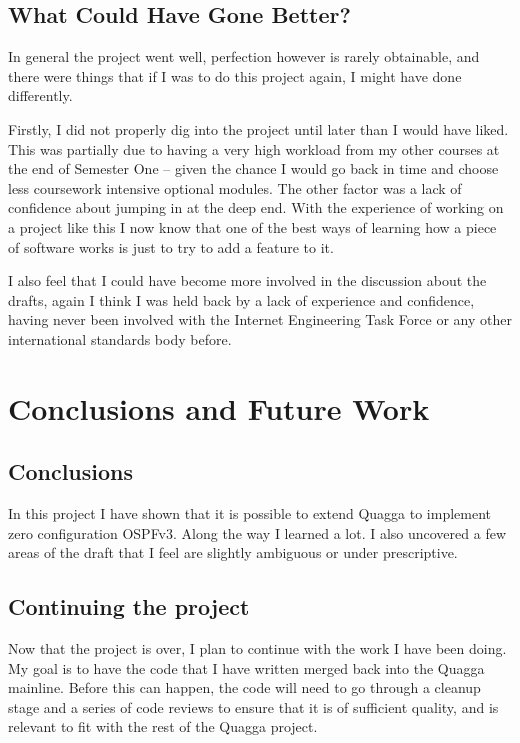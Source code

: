 \documentclass[12pt]{report}
\begin{document}
\section{What Could Have Gone Better?}
In general the project went well, perfection however is rarely obtainable, and
there were things that if I was to do this project again, I might have done
differently. 

Firstly, I did not properly dig into the project until later than I would have
liked.  This was partially due to having a very high workload from my other
courses at the end of Semester One -- given the chance I would go back in time
and choose less coursework intensive optional modules. The other factor was a
lack of confidence about jumping in at the deep end. With the experience of
working on a project like this I now know that one of the best ways of learning
how a piece of software works is just to try to add a feature to it.

I also feel that I could have become more involved in the discussion about the
drafts, again I think I was held back by a lack of experience and confidence,
having never been involved with the Internet Engineering Task Force or any
other international standards body before. 
 
\chapter{Conclusions and Future Work}

\section{Conclusions}
In this project I have shown that it is possible to extend Quagga to implement
zero configuration OSPFv3. Along the way I learned a lot. I also uncovered a
few areas of the draft that I feel are slightly ambiguous or under
prescriptive. 

\section{Continuing the project}
Now that the project is over, I plan to continue with the work I have been
doing.  My goal is to have the code that I have written merged back into the
Quagga mainline. Before this can happen, the code will need to go through a
cleanup stage and a series of code reviews to ensure that it is of sufficient
quality, and is relevant to fit with the rest of the Quagga project.
\end{document}
